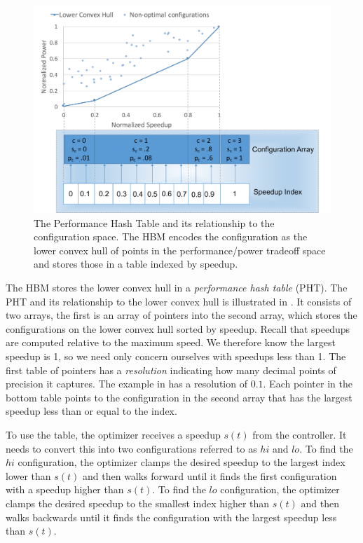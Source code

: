 \begin{figure}
  \includegraphics[width=\columnwidth]{figures/perforamance-hash-table.pdf}
  \caption{The Performance Hash Table and its relationship to the
    configuration space.  The HBM encodes the configuration as the
    lower convex hull of points in the performance/power tradeoff
    space and stores those in a table indexed by speedup.}
  \label{fig:pht}
\end{figure}

The HBM stores the lower convex hull in a \emph{performance hash
  table} (PHT).  The PHT and its relationship to the lower convex hull
is illustrated in .  It consists of two arrays, the first
is an array of pointers into the second array, which stores the
configurations on the lower convex hull sorted by speedup.  Recall
that speedups are computed relative to the maximum speed.  We
therefore know the largest speedup is 1, so we need only concern
ourselves with speedups less than 1.  The first table of pointers has
a \emph{resolution} indicating how many decimal points of precision it
captures.  The example in  has a resolution of $0.1$.
Each pointer in the bottom  table points to the configuration in the
second array that has the largest speedup less than or equal to the
index.

To use the table, the optimizer receives a speedup $s(t)$ from the
controller.  It needs to convert this into two configurations referred
to as $hi$ and $lo$.  To find the $hi$ configuration, the optimizer
clamps the desired speedup to the largest index lower than $s(t)$ and
then walks forward until it finds the first configuration with a
speedup higher than $s(t)$.  To find the $lo$ configuration, the
optimizer clamps the desired speedup to the smallest index higher than
$s(t)$ and then walks backwards until it finds the configuration with
the largest speedup less than $s(t)$.

